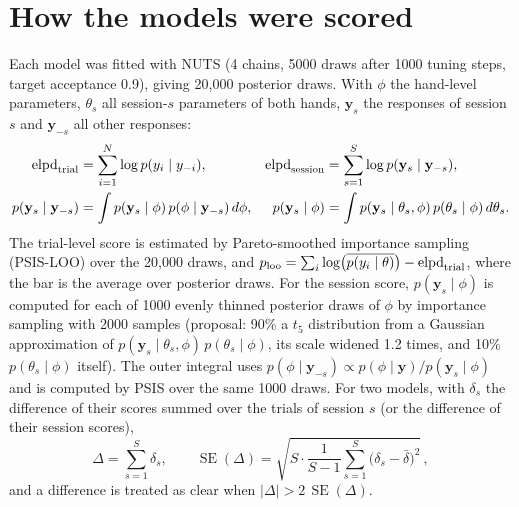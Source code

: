 \section{How the models were scored}
Each model was fitted with NUTS (4 chains, 5000 draws after 1000 tuning steps, target acceptance 0.9), giving 20,000 posterior draws.
With $\phi$ the hand-level parameters, $\theta_s$ all session-$s$ parameters of both hands, $\mathbf y_s$ the responses of session $s$ and $\mathbf y_{-s}$ all other responses:
\begin{align*}
\mathrm{elpd}_{\mathrm{trial}} &= \sum_{i=1}^{N}\log p(y_i\mid y_{-i}), &
\mathrm{elpd}_{\mathrm{session}} &= \sum_{s=1}^{S}\log p(\mathbf y_s\mid \mathbf y_{-s}),\\
p(\mathbf y_s\mid \mathbf y_{-s}) &= \int p(\mathbf y_s\mid\phi)\,p(\phi\mid\mathbf y_{-s})\,d\phi, &
p(\mathbf y_s\mid\phi) &= \int p(\mathbf y_s\mid\theta_s,\phi)\,p(\theta_s\mid\phi)\,d\theta_s .
\end{align*}
The trial-level score is estimated by Pareto-smoothed importance sampling (PSIS-LOO) over the 20,000 draws, and $p_{\mathrm{loo}}=\sum_i\log\bigl(\overline{p(y_i\mid\theta)}\bigr)-\mathrm{elpd}_{\mathrm{trial}}$, where the bar is the average over posterior draws.
For the session score, $p(\mathbf y_s\mid\phi)$ is computed for each of 1000 evenly thinned posterior draws of $\phi$ by importance sampling with 2000 samples (proposal: 90\% a $t_5$ distribution from a Gaussian approximation of $p(\mathbf y_s\mid\theta_s,\phi)\,p(\theta_s\mid\phi)$, its scale widened 1.2 times, and 10\% $p(\theta_s\mid\phi)$ itself).
The outer integral uses $p(\phi\mid\mathbf y_{-s})\propto p(\phi\mid\mathbf y)/p(\mathbf y_s\mid\phi)$ and is computed by PSIS over the same 1000 draws.
For two models, with $\delta_s$ the difference of their scores summed over the trials of session $s$ (or the difference of their session scores),
\[
\Delta=\sum_{s=1}^{S}\delta_s,\qquad \operatorname{SE}(\Delta)=\sqrt{S\cdot\frac{1}{S-1}\sum_{s=1}^{S}\bigl(\delta_s-\bar\delta\bigr)^2}\,,
\]
and a difference is treated as clear when $|\Delta|>2\,\operatorname{SE}(\Delta)$.


